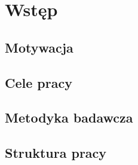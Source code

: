 
\def\filename{wstep}
\chapter{Wstęp}

\section{Motywacja}

\section{Cele pracy}

\section{Metodyka badawcza}

\section{Struktura pracy}


